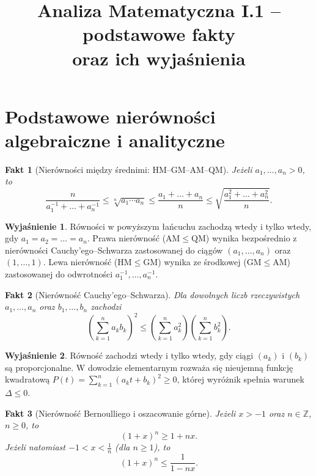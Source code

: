 \documentclass[11pt, a4paper]{article}
\title{\textbf{Analiza Matematyczna I.1} -- podstawowe fakty\\ oraz ich wyjaśnienia}
\author{}
\date{}
\theoremstyle{plain}
\newtheorem{fakt}{Fakt}
\theoremstyle{definition}
\newtheorem*{wyjasnienie}{Wyjaśnienie}
\begin{document}
\maketitle

\tableofcontents

\newpage

\section{Podstawowe nierówności algebraiczne i analityczne}

\begin{fakt}[Nierówności między średnimi: HM--GM--AM--QM]
Jeżeli $a_1, \dots, a_n > 0$, to
\[
\frac{n}{a_1^{-1} + \dots + a_n^{-1}} \leqslant \sqrt[n]{a_1 \cdots a_n} \leqslant \frac{a_1 + \dots + a_n}{n} \leqslant \sqrt{\frac{a_1^2 + \dots + a_n^2}{n}}.
\]
\end{fakt}

\begin{wyjasnienie}
Równości w powyższym łańcuchu zachodzą wtedy i tylko wtedy, gdy $a_1 = a_2 = \dots = a_n$. Prawa nierówność ($\mathrm{AM} \leqslant \mathrm{QM}$) wynika bezpośrednio z nierówności Cauchy'ego--Schwarza zastosowanej do ciągów $(a_1, \dots, a_n)$ oraz $(1, \dots, 1)$. Lewa nierówność ($\mathrm{HM} \leqslant \mathrm{GM}$) wynika ze środkowej ($\mathrm{GM} \leqslant \mathrm{AM}$) zastosowanej do odwrotności $a_1^{-1}, \dots, a_n^{-1}$.
\end{wyjasnienie}

\begin{fakt}[Nierówność Cauchy'ego--Schwarza]
Dla dowolnych liczb rzeczywistych $a_1, \dots, a_n$ oraz $b_1, \dots, b_n$ zachodzi
\[
\left(\sum_{k=1}^n a_k b_k\right)^2 \leqslant \left(\sum_{k=1}^n a_k^2\right)\left(\sum_{k=1}^n b_k^2\right).
\]
\end{fakt}

\begin{wyjasnienie}
Równość zachodzi wtedy i tylko wtedy, gdy ciągi $(a_k)$ i $(b_k)$ są proporcjonalne. W dowodzie elementarnym rozważa się nieujemną funkcję kwadratową $P(t) = \sum_{k=1}^n (a_k t + b_k)^2 \geqslant 0$, której wyróżnik spełnia warunek $\Delta \leqslant 0$.
\end{wyjasnienie}

\begin{fakt}[Nierówność Bernoulliego i oszacowanie górne]
Jeżeli $x > -1$ oraz $n \in \mathbb{Z}$, $n \geqslant 0$, to
\[
(1 + x)^n \geqslant 1 + nx.
\]
Jeżeli natomiast $-1 < x < \frac{1}{n}$ (dla $n \geqslant 1$), to
\[
(1 + x)^n \leqslant \frac{1}{1 - nx}.
\]
\end{fakt}
\end{document}
